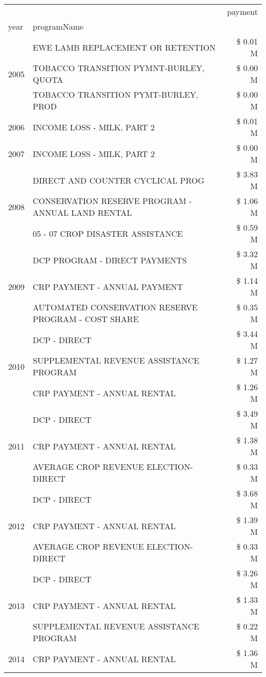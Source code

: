 \begin{tabular}{llr}
\toprule
 &  & payment \\
year & programName &  \\
\midrule
\multirow[t]{3}{*}{2005} & EWE LAMB REPLACEMENT OR RETENTION & \$ 0.01 M \\
 & TOBACCO TRANSITION PYMNT-BURLEY, QUOTA & \$ 0.00 M \\
 & TOBACCO TRANSITION PYMT-BURLEY, PROD & \$ 0.00 M \\
\cline{1-3}
2006 & INCOME LOSS - MILK, PART 2 & \$ 0.01 M \\
\cline{1-3}
2007 & INCOME LOSS - MILK, PART 2 & \$ 0.00 M \\
\cline{1-3}
\multirow[t]{3}{*}{2008} & DIRECT AND COUNTER CYCLICAL PROG & \$ 3.83 M \\
 & CONSERVATION RESERVE PROGRAM - ANNUAL LAND RENTAL & \$ 1.06 M \\
 & 05 - 07 CROP DISASTER ASSISTANCE & \$ 0.59 M \\
\cline{1-3}
\multirow[t]{3}{*}{2009} & DCP PROGRAM - DIRECT PAYMENTS & \$ 3.32 M \\
 & CRP PAYMENT - ANNUAL PAYMENT & \$ 1.14 M \\
 & AUTOMATED CONSERVATION RESERVE PROGRAM - COST SHARE & \$ 0.35 M \\
\cline{1-3}
\multirow[t]{3}{*}{2010} & DCP - DIRECT & \$ 3.44 M \\
 & SUPPLEMENTAL REVENUE ASSISTANCE PROGRAM & \$ 1.27 M \\
 & CRP PAYMENT - ANNUAL RENTAL & \$ 1.26 M \\
\cline{1-3}
\multirow[t]{3}{*}{2011} & DCP - DIRECT & \$ 3.49 M \\
 & CRP PAYMENT - ANNUAL RENTAL & \$ 1.38 M \\
 & AVERAGE CROP REVENUE ELECTION-DIRECT & \$ 0.33 M \\
\cline{1-3}
\multirow[t]{3}{*}{2012} & DCP - DIRECT & \$ 3.68 M \\
 & CRP PAYMENT - ANNUAL RENTAL & \$ 1.39 M \\
 & AVERAGE CROP REVENUE ELECTION-DIRECT & \$ 0.33 M \\
\cline{1-3}
\multirow[t]{3}{*}{2013} & DCP - DIRECT & \$ 3.26 M \\
 & CRP PAYMENT - ANNUAL RENTAL & \$ 1.33 M \\
 & SUPPLEMENTAL REVENUE ASSISTANCE PROGRAM & \$ 0.22 M \\
\cline{1-3}
\multirow[t]{3}{*}{2014} & CRP PAYMENT - ANNUAL RENTAL & \$ 1.36 M \\

\end{tabular}
